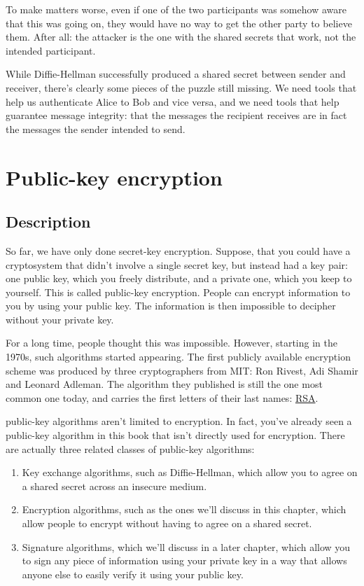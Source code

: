 \documentclass[11pt,ebook,table,dvipsnames]{memoir}
\begin{document}
To make matters worse, even if one of the two participants was somehow
aware that this was going on, they would have no way to get the other
party to believe them. After all: the attacker is the one with the
shared secrets that work, not the intended participant.

While Diffie-Hellman successfully produced a shared secret between
sender and receiver, there's clearly some pieces of the puzzle still
missing. We need tools that help us authenticate Alice to Bob and vice
versa, and we need tools that help guarantee message integrity: that
the messages the recipient receives are in fact the messages the
sender intended to send.
\chapter{Public-key encryption}
\label{sec-2-5}
\section{Description}
\label{sec-2-5-1}

So far, we have only done \gls{secret-key encryption}. Suppose, that
you could have a cryptosystem that didn't involve a single secret key,
but instead had a key pair: one public key, which you freely
distribute, and a private one, which you keep to yourself. This is
called \gls{public-key encryption}. People can encrypt information to
you by using your public key. The information is then impossible to
decipher without your private key.

For a long time, people thought this was impossible. However, starting
in the 1970s, such algorithms started appearing. The first publicly
available encryption scheme was produced by three cryptographers from
MIT: Ron Rivest, Adi Shamir and Leonard Adleman. The algorithm they
published is still the one most common one today, and carries the
first letters of their last names: \hyperref[RSA]{RSA}.

\Glspl{public-key algorithm} aren't limited to encryption. In fact,
you've already seen a public-key algorithm in this book that isn't
directly used for encryption. There are actually three related classes
of public-key algorithms:

\begin{enumerate}
\item Key exchange algorithms, such as Diffie-Hellman, which allow you
to agree on a shared secret across an insecure medium.
\item Encryption algorithms, such as the ones we'll discuss in this
chapter, which allow people to encrypt without having to agree on
a shared secret.
\item Signature algorithms, which we'll discuss in a later chapter, which
allow you to sign any piece of information using your private key
in a way that allows anyone else to easily verify it using your
public key.
\end{enumerate}
\end{document}
